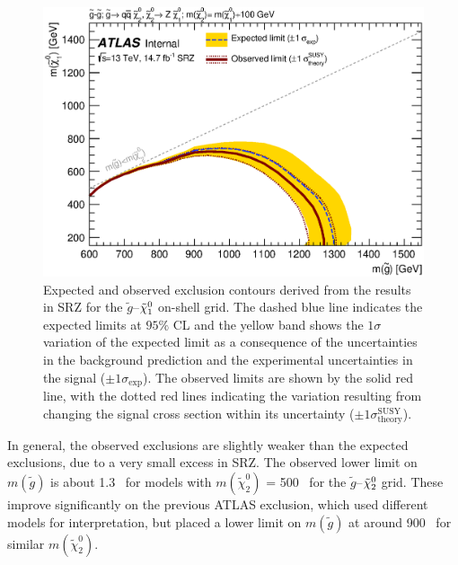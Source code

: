 \begin{figure}[htbp]
\centering
\includegraphics[width=.8\textwidth]{figures/interpretation/excl_SM_GG_N2.eps}
\caption{
Expected and observed exclusion contours derived from the results in SRZ for the $\tilde{g}$--$\tilde{\chi}_1^0$ on-shell grid. 
The dashed blue line indicates the expected limits at $95\%$ CL and the yellow band shows the $1\sigma$ variation of the expected limit as a consequence of the uncertainties in the background prediction and the experimental uncertainties in the signal ($\pm1\sigma_\text{exp}$). 
The observed limits are shown by the solid red line, with the dotted red lines indicating the variation resulting from changing the signal cross section within its uncertainty ($\pm1\sigma^\text{SUSY}_\text{theory}$).
\label{fig:excl_SMGGN2}
}
\end{figure}

In general, the observed exclusions are slightly weaker than the expected exclusions, due to a very small excess in SRZ. The observed lower limit on $m(\tilde{g})$ is about 1.3 \tev~for models with $m(\tilde{\chi}^{0}_{2})$ = 500 \gev~for the $\tilde{g}$--$\tilde{\chi}_2^0$ grid. These improve significantly on the previous ATLAS exclusion, which used different models for interpretation, but placed a lower limit on $m(\tilde{g})$ at around 900 \gev~for similar $m(\tilde{\chi}^{0}_{2})$. 



